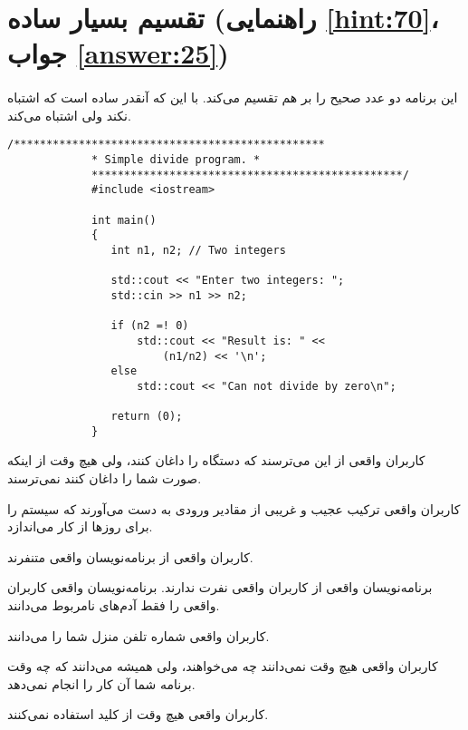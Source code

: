 \section[تقسیم بسیار ساده]{تقسیم بسیار ساده \protect{} (راهنمایی \ref{hint:70}، جواب \ref{answer:25})}
\paragraph{}\label{prog:24}
این برنامه دو عدد صحیح را بر هم تقسیم می‌کند. با این که آنقدر ساده است که اشتباه نکند ولی اشتباه می‌کند.

\begin{LTR}
        \begin{lstlisting}[style=C++Style]
             /************************************************
             * Simple divide program. *
             ************************************************/
             #include <iostream>

             int main()
             {
             	int n1, n2; // Two integers

             	std::cout << "Enter two integers: ";
             	std::cin >> n1 >> n2;

             	if (n2 =! 0)
             		std::cout << "Result is: " <<
             			(n1/n2) << '\n';
             	else
             		std::cout << "Can not divide by zero\n";

             	return (0);
             }
        \end{lstlisting}
\end{LTR}

\begin{tcolorbox}
    کاربران واقعی از این می‌ترسند که دستگاه را داغان کنند، ولی هیچ وقت از اینکه صورت شما را داغان کنند نمی‌ترسند.

    کاربران واقعی ترکیب عجیب و غریبی از مقادیر ورودی به دست می‌آورند که سیستم را برای روزها از کار می‌اندازد.

    کاربران واقعی از برنامه‌نویسان واقعی متنفرند.

    برنامه‌نویسان واقعی از کاربران واقعی نفرت ندارند. برنامه‌نویسان واقعی کاربران واقعی را فقط آدم‌های نامربوط می‌دانند.

    کاربران واقعی شماره تلفن منزل شما را می‌دانند.

    کاربران واقعی هیچ وقت نمی‌دانند چه می‌خواهند، ولی همیشه می‌دانند که چه وقت برنامه شما آن کار را انجام نمی‌دهد.

    کاربران واقعی هیچ وقت از کلید  استفاده نمی‌کنند.
\end{tcolorbox}